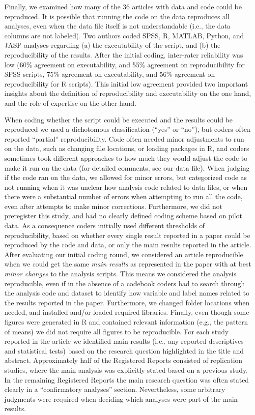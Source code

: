 \documentclass[
  ,jou, a4paper,floatsintext]{apa6}
\begin{document}
Finally, we examined how many of the 36 articles with data and code could be reproduced. It is possible that running the code on the data reproduces all analyses, even when the data file itself is not understandable (i.e., the data columns are not labeled). Two authors coded SPSS, R, MATLAB, Python, and JASP analyses regarding (a) the executability of the script, and (b) the reproducibility of the results. After the initial coding, inter-rater reliability was low (60\% agreement on executability, and 55\% agreement on reproducibility for SPSS scripts, 75\% agreement on executability, and 56\% agreement on reproducibility for R scripts). This initial low agreement provided two important insights about the definition of reproducibility and executability on the one hand, and the role of expertise on the other hand.

When coding whether the script could be executed and the results could be reproduced we used a dichotomous classification (\enquote{yes} or \enquote{no}), but coders often reported \enquote{partial} reproducibility. Code often needed minor adjustments to run on the data, such as changing file locations, or loading packages in R, and coders sometimes took different approaches to how much they would adjust the code to make it run on the data (for detailed comments, see our data file). When judging if the code ran on the data, we allowed for minor errors, but categorized code as not running when it was unclear how analysis code related to data files, or when there were a substantial number of errors when attempting to run all the code, even after attempts to make minor corrections. Furthermore, we did not preregister this study, and had no clearly defined coding scheme based on pilot data. As a consequence coders initially used different thresholds of reproducibility, based on whether every single result reported in a paper could be reproduced by the code and data, or only the main results reported in the article. After evaluating our initial coding round, we considered an article reproducible when we could get the same \emph{main results} as represented in the paper with at best \emph{minor changes} to the analysis scripts. This means we considered the analysis reproducible, even if in the absence of a codebook coders had to search through the analysis code and dataset to identify how variable and label names related to the results reported in the paper. Furthermore, we changed folder locations when needed, and installed and/or loaded required libraries. Finally, even though some figures were generated in R and contained relevant information (e.g., the pattern of means) we did not require all figures to be reproducible. For each study reported in the article we identified main results (i.e., any reported descriptives and statistical tests) based on the research question highlighted in the title and abstract. Approximately half of the Registered Reports consisted of replication studies, where the main analysis was explicitly stated based on a previous study. In the remaining Registered Reports the main research question was often stated clearly in a \enquote{confirmatory analyses} section. Nevertheless, some arbitrary judgments were required when deciding which analyses were part of the main results.
\end{document}
